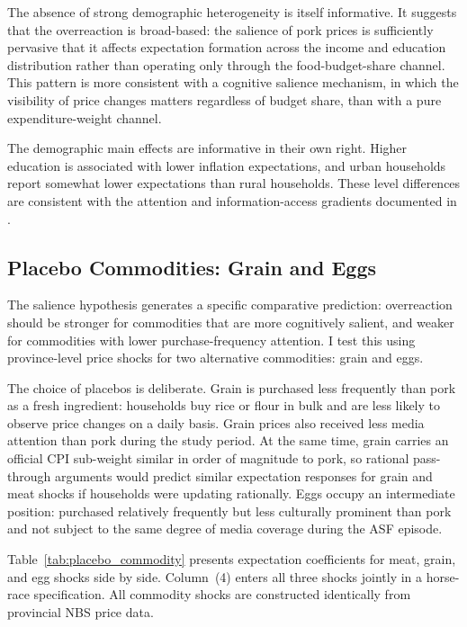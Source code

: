 The absence of strong demographic heterogeneity is itself
informative.
It suggests that the overreaction is broad-based: the salience
of pork prices is sufficiently pervasive that it affects
expectation formation across the income and education
distribution rather than operating only through the
food-budget-share channel.
This pattern is more consistent with a cognitive salience
mechanism, in which the visibility of price changes matters
regardless of budget share, than with a pure
expenditure-weight channel.

The demographic main effects are informative in their own right.
Higher education is associated with lower inflation expectations,
and urban households report somewhat lower expectations than
rural households.
These level differences are consistent with the attention
and information-access gradients documented in
\citet{DacuntoHoangPirolliWeber2021}.

\subsection{Placebo Commodities: Grain and Eggs}%
\label{sec:placebo}



The salience hypothesis generates a specific comparative
prediction: overreaction should be stronger for commodities
that are more cognitively salient, and weaker for commodities
with lower purchase-frequency attention.
I test this using province-level price shocks for two
alternative commodities: grain and eggs.

The choice of placebos is deliberate.
Grain is purchased less frequently than pork as a fresh
ingredient: households buy rice or flour in bulk and are
less likely to observe price changes on a daily basis.
Grain prices also received less media attention than pork
during the study period.
At the same time, grain carries an official CPI sub-weight
similar in order of magnitude to pork, so rational
pass-through arguments would predict similar expectation
responses for grain and meat shocks if households were
updating rationally.
Eggs occupy an intermediate position: purchased relatively
frequently but less culturally prominent than pork and not
subject to the same degree of media coverage during the
ASF episode.

Table~\ref{tab:placebo_commodity} presents expectation
coefficients for meat, grain, and egg shocks side by side.
Column~(4) enters all three shocks jointly in a horse-race
specification.
All commodity shocks are constructed identically from
provincial NBS price data.

